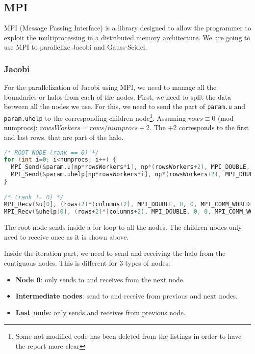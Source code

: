 \documentclass[a4paper, 10pt]{article}
\begin{document}
\clearpage

\subsection{MPI}

MPI (Message Passing Interface) is a library designed to allow the programmer to exploit the multiprocessing in a distributed memory architecture. We are going to use MPI to parallelize Jacobi and Gauss-Seidel.

\subsubsection{Jacobi}

For the parallelization of Jacobi using MPI, we need to manage all the boundaries or halos from each of the nodes. First, we need to split the data between all the nodes we use. For this, we need to send the part of \texttt{param.u} and \texttt{param.uhelp} to the corresponding children node\footnote{Some not modified code has been deleted from the listings in order to have the report more clear}. Assuming $rows \equiv 0 $ (mod numprocs): $rowsWorkers = rows / numprocs + 2$. The +2 corresponds to the first and last rows, that are part of the halo.

\begin{lstlisting}[language=c, caption={Sending/Receiving initial data to all nodes}]
/* ROOT NODE (rank == 0) */
for (int i=0; i<numprocs; i++) {
  MPI_Send(&param.u[np*rowsWorkers*i], np*(rowsWorkers+2), MPI_DOUBLE, i, 0, MPI_COMM_WORLD);
  MPI_Send(&param.uhelp[np*rowsWorkers*i], np*(rowsWorkers+2), MPI_DOUBLE, i, 0, MPI_COMM_WORLD);
}    

/* (rank != 0) */
MPI_Recv(&u[0], (rows+2)*(columns+2), MPI_DOUBLE, 0, 0, MPI_COMM_WORLD, &status);
MPI_Recv(&uhelp[0], (rows+2)*(columns+2), MPI_DOUBLE, 0, 0, MPI_COMM_WORLD, &status);
\end{lstlisting}

The root node sends inside a for loop to all the nodes. The children nodes only need to receive once as it is shown above.


Inside the iteration part, we need to send and receiving the halo from the contiguous nodes. This is different for 3 types of nodes:

\begin{itemize}
  \item \textbf{Node 0}: only sends to and receives from the next node.
  \item \textbf{Intermediate nodes}: send to and receive from previous and next nodes.
  \item \textbf{Last node}: only sends and receives from previous node.
\end{itemize}
\end{document}
